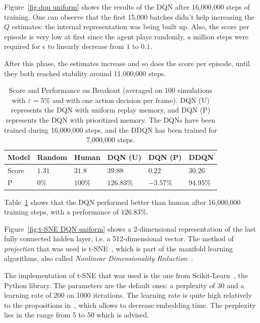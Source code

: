 \documentclass[letterpaper]{article}
\begin{document}
Figure~\ref{fig:dqn uniform} shows the results of the DQN after 16,000,000 steps of training. One can observe that the first 15,000 batches didn't help
increasing the $Q$ estimates: the internal representation was being built up. Also, the score per episode is very low at first since the agent plays
randomly, a million steps were required for $\epsilon$ to linearly decrease from $1$ to $0.1$.

After this phase, the estimates increase and so does the score per episode, until they both reached stability around 11,000,000 steps.

\begin{table}[!h]
	\centering
	\small
	\setlength\tabcolsep{5pt}
	\begin{tabular}{l|l|l|l|l|l}
		Model & Random & Human & DQN (U) & DQN (P) & DDQN \\ \hline \hline
		Score & $1.31$ & $31.8$ & $39.88$ & $0.22$ & $30.26$ \\ \hline
		P &  $0\%$ & $100\%$ & $126.83\%$ & $-3.57\%$ & $94.95\%$
	\end{tabular}
	\caption{Score and Performance on Breakout (averaged on 100 simulations with $\varepsilon=5\%$ and with one action decision per frame). DQN (U) represents the
	DQN with uniform replay memory, and DQN (P) represents the DQN with prioritized memory. The DQNs have been trained during 16,000,000 steps, and the DDQN has
	been trained for 7,000,000 steps.\label{tab:scores breakout}}
\end{table}

Table~\ref{tab:scores breakout} shows that the DQN performed better than human after 16,000,000 training steps, with a performance of $126.83\%$.

Figure~\ref{fig:t-SNE DQN uniform} shows a 2-dimensional representation of the last fully connected hidden layer, i.e. a 512-dimensional
vector. The method of \textit{projection} that was used is t-SNE~\citep{maaten2008visualizing}, which is part of the manifold learning algorithms, also
called \textit{Nonlinear Dimensionality Reduction}~\citep{lee2007nonlinear}.

The implementation of t-SNE that was used is the one from Scikit-Learn~\citep{scikit-learn}, the Python library. The parameters are the default ones:
a perplexity of 30 and a learning rate of 200 on 1000 iterations. The learning rate is quite high relatively to the propositions in~\cite{wattenberg2016how},
which allows to decrease embedding time. The perplexity lies in the range from 5 to 50 which is advised.
\end{document}
